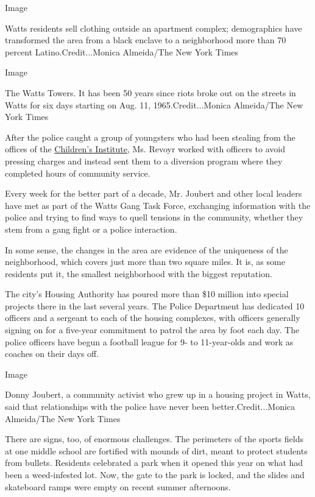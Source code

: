 Image

Watts residents sell clothing outside an apartment complex; demographics
have transformed the area from a black enclave to a neighborhood more
than 70 percent Latino.Credit...Monica Almeida/The New York Times

Image

The Watts Towers. It has been 50 years since riots broke out on the
streets in Watts for six days starting on Aug. 11, 1965.Credit...Monica
Almeida/The New York Times

After the police caught a group of youngsters who had been stealing from
the offices of the
\href{http://www.childrensinstitute.org/about/staff}{Children's
Institute}, Ms. Revoyr worked with officers to avoid pressing charges
and instead sent them to a diversion program where they completed hours
of community service.

Every week for the better part of a decade, Mr. Joubert and other local
leaders have met as part of the Watts Gang Task Force, exchanging
information with the police and trying to find ways to quell tensions in
the community, whether they stem from a gang fight or a police
interaction.

In some sense, the changes in the area are evidence of the uniqueness of
the neighborhood, which covers just more than two square miles. It is,
as some residents put it, the smallest neighborhood with the biggest
reputation.

The city's Housing Authority has poured more than \$10 million into
special projects there in the last several years. The Police Department
has dedicated 10 officers and a sergeant to each of the housing
complexes, with officers generally signing on for a five-year commitment
to patrol the area by foot each day. The police officers have begun a
football league for 9- to 11-year-olds and work as coaches on their days
off.

Image

Donny Joubert, a community activist who grew up in a housing project in
Watts, said that relationships with the police have never been
better.Credit...Monica Almeida/The New York Times

There are signs, too, of enormous challenges. The perimeters of the
sports fields at one middle school are fortified with mounds of dirt,
meant to protect students from bullets. Residents celebrated a park when
it opened this year on what had been a weed-infested lot. Now, the gate
to the park is locked, and the slides and skateboard ramps were empty on
recent summer afternoons.

